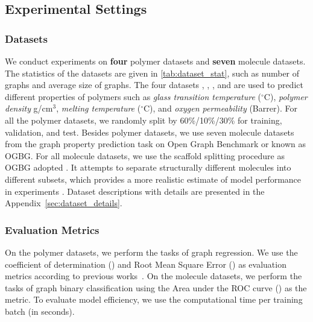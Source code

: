 \documentclass[sigconf]{acmart}
\begin{document}
\vspace{-0.05in}
\subsection{Experimental Settings}

\subsubsection{Datasets} 
We conduct experiments on \textbf{four} polymer datasets and \textbf{seven} molecule datasets. 
The statistics of the datasets are given in \cref{tab:dataset_stat}, such as number of graphs and average size of graphs. The four datasets \glassTemp, \meltTemp, \density, and \oxygen are used to predict different properties of polymers such as \emph{glass transition temperature} ($^\circ$C), \emph{polymer density} g/cm$^3$, \emph{melting temperature} ($^\circ$C), and \emph{oxygen permeability} (Barrer). For all the polymer datasets, we randomly split by 60\%/10\%/30\% for training, validation, and test. 
Besides polymer datasets, we use seven molecule datasets from the graph property prediction task on Open Graph Benchmark or known as OGBG. For all molecule datasets, we use the scaffold splitting procedure as OGBG adopted \cite{hu2020open}. It attempts to separate structurally different molecules into different subsets, which provides a more realistic estimate of model performance in experiments \cite{wu2018moleculenet}. Dataset descriptions with details are presented in the Appendix~\ref{sec:dataset_details}. 

\vspace{-0.03in}
\subsubsection{Evaluation Metrics} On the polymer datasets, we perform the tasks of graph regression. We use the coefficient of determination (\regreRSquare) and Root Mean Square Error (\regreRMSE) as evaluation metrics according to previous works~\cite{ma2020pi1m,hu2020open}.
On the molecule datasets, we perform the tasks of graph binary classification using the Area under the ROC curve (\classifyAUC) as the metric.
To evaluate model efficiency, we use the computational time per training batch (in seconds).

\vspace{-0.03in}
\end{document}
